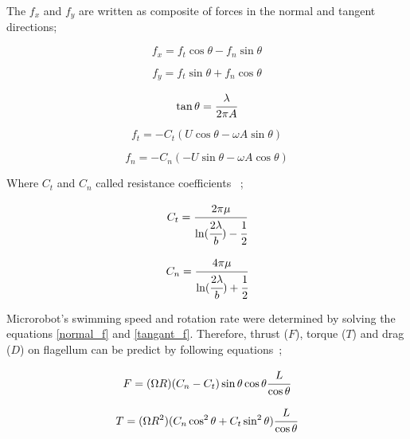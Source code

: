 \documentclass[12pt,a4paper,titlepage]{report}
\begin{document}
The $f_x$ and $f_y$ are written as composite of forces in the normal and tangent directions;

\begin{equation}
 f_x  = f_t\cos \theta - f_n\sin \theta
\label{normal}
\end{equation}



\begin{equation}
 f_y = f_t\sin \theta + f_n\cos \theta
\label{tangant}
\end{equation}

\begin{equation}
 \tan \theta  = \cfrac{\lambda}{2\pi A}
\label{tang}
\end{equation}



\begin{equation}
 f_t = -C_t(U \cos \theta - \omega A \sin \theta)
\label{normal_f}
\end{equation}



\begin{equation}
f_n = - C_n(-U \sin \theta - \omega A \cos \theta)
\label{tangant_f}
\end{equation}

Where $C_t$ and $C_n$ called resistance coefficients ~\citep{edd2003biomimetic};
 

\begin{equation}
 C_t = \cfrac{2 \pi \mu}{\ln (\cfrac{2 \lambda}{b}) - \cfrac{1}{2}}
\label{Coeffient1}
\end{equation}



\begin{equation}
 C_n = \cfrac{4 \pi \mu}{\ln (\cfrac{2 \lambda}{b}) + \cfrac{1}{2}}
\label{Coeffient1}
\end{equation}

Microrobot\rq{}s swimming speed and rotation rate were determined by solving 
the equations \ref{normal_f} and \ref{tangant_f}. Therefore, thrust ($F$), torque ($T$) and drag ($D$) 
on flagellum can be predict by following equations~\citep{rodenborn2013propulsion};

\begin{equation}
 F = (\Omega R)(C_n - C_t) \sin \theta \cos \theta \cfrac{L}{\cos \theta} 
\label{thrust}
\end{equation}

\begin{equation}
 T = (\Omega R^2)(C_n \cos ^2 \theta + C_t \sin ^2 \theta) \cfrac{L}{\cos \theta}
\label{torque}
\end{equation}
\end{document}
